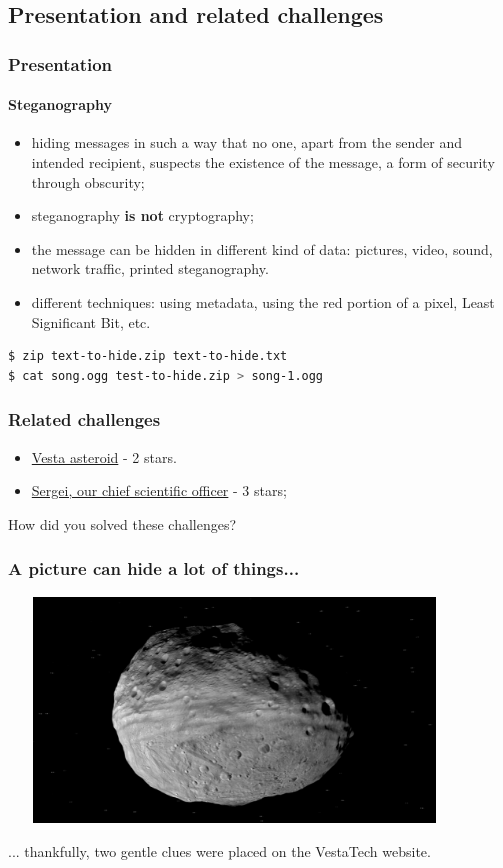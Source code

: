 \documentclass[]{beamer}
\begin{document}
\subsection{Presentation and related challenges}
\begin{frame}[fragile]
\frametitle{Presentation}
\framesubtitle{Steganography}
\begin{itemize}
    \item hiding messages in such a way that no one, apart from the sender and intended recipient, suspects the existence of the message, a form of security through obscurity;
    \item steganography \textbf{is not} cryptography;
    \item the message can be hidden in different kind of data: pictures, video, sound, network traffic, printed steganography.
    \item different techniques: using metadata, using the red portion of a pixel, Least Significant Bit, etc.
\end{itemize}
\begin{lstlisting}[language=Bash]
$ zip text-to-hide.zip text-to-hide.txt
$ cat song.ogg test-to-hide.zip > song-1.ogg
\end{lstlisting}
\end{frame}

\begin{frame}
\frametitle{Related challenges}
\begin{itemize}
    \item \href{https://github.com/cscluxembourg/vestatech/blob/master/challenges/Vesta-asteroid/vesta.png}{Vesta asteroid} - 2 stars.
    \item \href{https://github.com/cscluxembourg/vestatech/blob/master/challenges/sergei/Sergei.png}{Sergei, our chief scientific officer} - 3 stars;
\end{itemize}
\bigskip
How did you solved these challenges?
\end{frame}

\begin{frame}
\frametitle{A picture can hide a lot of things...}
\begin{center}
    \includegraphics[height=6.0cm, width=12.0cm]{./images/vesta.png}
\end{center}
... thankfully, two gentle clues were placed on the VestaTech website.
\end{frame}
\end{document}
